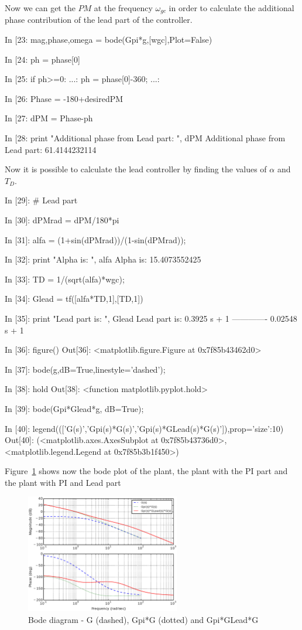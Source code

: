 Now we can get the $PM$ at the frequency $\omega_{gc}$ in order to calculate 
the additional phase contribution of the lead part of the controller.

\begin{code}
In [23: mag,phase,omega = bode(Gpi*g,[wgc],Plot=False)

In [24: ph = phase[0]

In [25: if ph>=0:
    ...:     ph = phase[0]-360;
    ...:     

In [26: Phase = -180+desiredPM

In [27: dPM = Phase-ph

In [28: print "Additional phase from Lead part: ", dPM
Additional phase from Lead part:  61.4144232114
\end{code}

Now it is possible to calculate the lead controller by finding the values of 
$\alpha$ and $T_D$.

\begin{code}
In [29]: # Lead part

In [30]: dPMrad = dPM/180*pi

In [31]: alfa = (1+sin(dPMrad))/(1-sin(dPMrad));

In [32]: print "Alpha is: ", alfa
Alpha is:  15.4073552425

In [33]: TD = 1/(sqrt(alfa)*wgc);

In [34]: Glead = tf([alfa*TD,1],[TD,1])

In [35]: print "Lead part is: ", Glead
Lead part is:  
 0.3925 s + 1
-------------
0.02548 s + 1


In [36]: figure()
Out[36]: <matplotlib.figure.Figure at 0x7f85b43462d0>

In [37]: bode(g,dB=True,linestyle='dashed');

In [38]: hold
Out[38]: <function matplotlib.pyplot.hold>

In [39]: bode(Gpi*Glead*g, dB=True);

In [40]: 
legend((['G(s)','Gpi(s)*G(s)','Gpi(s)*GLead(s)*G(s)']),prop={'size':10})
Out[40]: 
(<matplotlib.axes.AxesSubplot at 0x7f85b43736d0>,
 <matplotlib.legend.Legend at 0x7f85b3b1f450>)
\end{code}

Figure~\ref{F12} shows now the bode plot of the plant, the plant with the PI 
part and the plant with PI and Lead part

\begin{figure}[htbp]	%
\centering
\includegraphics[width=0.6\textwidth]{eps/bodeplantpilead.eps}
\caption{Bode diagram - G (dashed), Gpi*G (dotted) and Gpi*GLead*G}
\label{F12}
\end{figure}

